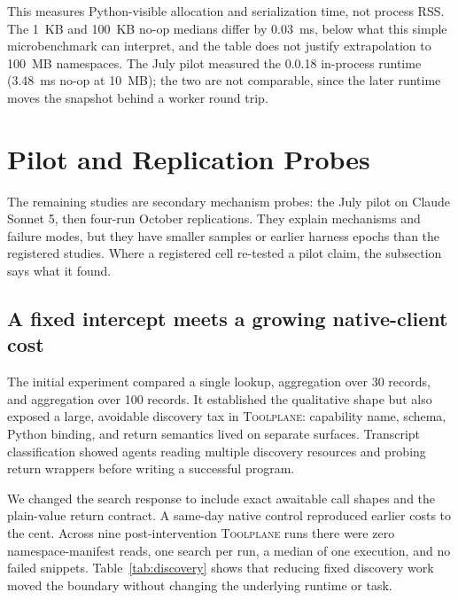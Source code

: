 \documentclass[10pt,twocolumn]{article}
\newcommand{\toolplane}{\textsc{Toolplane}\xspace}
\begin{document}
This measures Python-visible allocation and serialization time, not process
RSS.  The 1~KB and 100~KB no-op medians differ by 0.03~ms, below what this
simple microbenchmark can interpret, and the table does not justify
extrapolation to 100~MB namespaces.  The July pilot measured the 0.0.18
in-process runtime (3.48~ms no-op at 10~MB); the two are not comparable, since
the later runtime moves the snapshot behind a worker round trip.




\section{Pilot and Replication Probes}
\label{sec:additional-probes}

The remaining studies are secondary mechanism probes: the July pilot on
Claude Sonnet 5, then four-run October replications.  They explain mechanisms
and failure modes, but they have smaller samples or earlier harness epochs
than the registered studies.  Where a registered cell re-tested a pilot claim,
the subsection says what it found.

\subsection{A fixed intercept meets a growing native-client cost}

The initial experiment compared a single lookup, aggregation over 30 records,
and aggregation over 100 records.  It established the qualitative shape but
also exposed a large, avoidable discovery tax in \toolplane: capability name,
schema, Python binding, and return semantics lived on separate surfaces.
Transcript classification showed agents reading multiple discovery resources
and probing return wrappers before writing a successful program.

We changed the search response to include exact awaitable call shapes and the
plain-value return contract.  A same-day native control reproduced earlier
costs to the cent.  Across nine post-intervention \toolplane runs there were
zero namespace-manifest reads, one search per run, a median of one execution,
and no failed snippets.  Table~\ref{tab:discovery} shows that reducing fixed
discovery work moved the boundary without changing the underlying runtime or
task.
\end{document}
